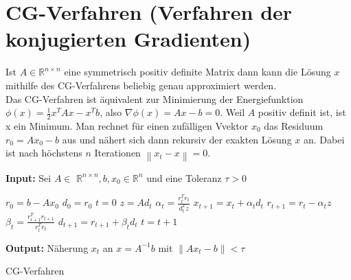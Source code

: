 \documentclass[12pt,a4paper]{scrartcl}
\numberwithin{equation}{section}
\numberwithin{myalgctr}{section}
\numberwithin{mytheoremctr}{subsection}
\numberwithin{mykorollarctr}{subsection}
\numberwithin{mylemmactr}{subsection}
\numberwithin{mybeispielctr}{subsection}
\newcommand\norm[1]{\left\lVert#1\right\rVert}
\begin{document}
	\section{CG-Verfahren (Verfahren der konjugierten Gradienten)}
	
	Ist  $A\in\mathbb{R}^{n\times n}$ eine symmetrisch positiv definite Matrix dann kann die Lösung $x$ mithilfe des CG-Verfahrens beliebig genau approximiert werden.\\
	Das CG-Verfahren ist äquivalent zur Minimierung der Energiefunktion $\phi(x) = \frac{1}{2}x^{T}Ax - x^{T}b$, also $\nabla\phi(x) = Ax - b = 0$. Weil $A$ positiv definit ist, ist x ein Minimum. Man rechnet für einen zufälligen Vvektor $x_0$ das Residuum $r_0 = Ax_0 - b$ aus und nähert sich dann rekursiv der exakten Lösung $x$ an. Dabei ist nach höchstens $n$ Iterationen $\norm{x_t - x} = 0$.
	
	\begin{algorithm}[H]
		\textbf{Input:} Sei $A\in$ $\mathbb{R}^{n\times n}, b, x_0 \in \mathbb{R}^{n}$ und eine Toleranz $\tau > 0$
		\begin{algorithmic}[1]
			\State $r_0 = b - Ax_0$
			\State $d_0 = r_0$
			\State $t = 0$
			\While{$ \norm{r_t} > \tau $}
			\State $z = Ad_t$
			\State $\alpha_t = \frac{r_t^{T}r_t}{d_t^{T}z}$
			\State $x_{t+1} = x_{t} + \alpha_t d_t$
			\State $r_{t+1} = r_t - \alpha_t z$
			\State $\beta_t = \frac{r_{t+1}^{T}r_{t+1}}{r_t^{T}r_t}$
			\State $d_{t+1} = r_{t+1} + \beta_td_t$
			\State $t = t + 1$
			\EndWhile
		\end{algorithmic}
		\textbf{Output:} Näherung $x_t$ an $x = A^{-1}b$ mit $\norm{Ax_t-b} < \tau$
		
		\caption{CG-Verfahren} \label{alg:cg}
	\end{algorithm}
	
	 
	
\end{document}
